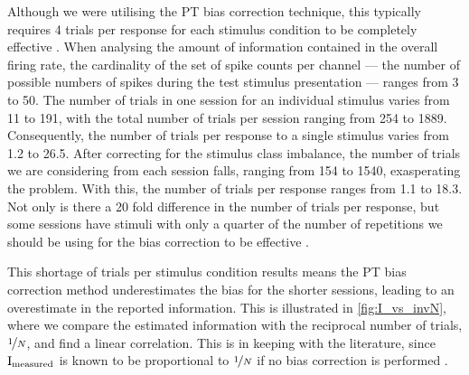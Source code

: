 
Although we were utilising the \ac{PT} bias correction technique, this typically requires \num{4} trials per response for each stimulus condition to be completely effective \citep{Panzeri2007}.
When analysing the amount of information contained in the overall firing rate, the cardinality of the set of spike counts per channel --- the number of possible numbers of spikes during the test stimulus presentation --- ranges from \num{3} to \num{50}.
The number of trials in one session for an individual stimulus varies from \num{11} to \num{191}, with the total number of trials per session ranging from \num{254} to \num{1889}.
Consequently, the number of trials per response to a single stimulus varies from \num{1.2} to \num{26.5}.
After correcting for the stimulus class imbalance, the number of trials we are considering from each session falls, ranging from \num{154} to \num{1540}, exasperating the problem.
With this, the number of trials per response ranges from \num{1.1} to \num{18.3}.
Not only is there a \num{20} fold difference in the number of trials per response, but some sessions have stimuli with only a quarter of the number of repetitions we should be using for the bias correction to be effective \citep{Panzeri2007}.

This shortage of trials per stimulus condition results means the \ac{PT} bias correction method underestimates the bias for the shorter sessions, leading to an overestimate in the reported information.
This is illustrated in \autoref{fig:I_vs_invN}, where we compare the estimated information with the reciprocal number of trials, $\nicefrac{1}{N}$, and find a linear correlation.
This is in keeping with the literature, since $\operatorname{I}_{\text{measured}}$ is known to be proportional to $\nicefrac{1}{N}$ if no bias correction is performed \citep{Treves1995}.

